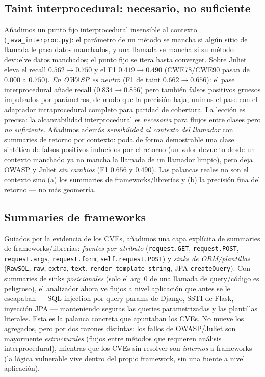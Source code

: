\documentclass[11pt]{article}
\begin{document}
\subsection{Taint interprocedural: necesario, no suficiente}
Añadimos un punto fijo interprocedural insensible al contexto
(\texttt{java\_interproc.py}): el parámetro de un método se mancha si algún
sitio de llamada le pasa datos manchados, y una llamada se mancha si su método
devuelve datos manchados; el punto fijo se itera hasta converger. Sobre Juliet
eleva el recall $0.562\to0.750$ y el F1 $0.419\to0.490$ (CWE78/CWE90 pasan de
$0.000$ a $0.750$). \emph{En OWASP es neutro} (F1 de taint $0.662\to0.656$): el
pase interprocedural añade recall ($0.834\to0.856$) pero también falsos positivos
gruesos impulsados por parámetros, de modo que la precisión baja; unimos el pase
con el adaptador intraprocedural completo para paridad de cobertura. La lección es
precisa: la alcanzabilidad interprocedural es \emph{necesaria} para flujos entre
clases pero \emph{no suficiente}. Añadimos además \emph{sensibilidad al contexto
del llamador} con summaries de retorno por contexto: poda de forma demostrable una
clase sintética de falsos positivos inducidos por el retorno (un valor devuelto
desde un contexto manchado ya no mancha la llamada de un llamador limpio), pero
deja OWASP y Juliet \emph{sin cambios} (F1 $0.656$ y $0.490$). Las palancas reales
no son el contexto sino (a) los summaries de frameworks/librerías y (b) la
precisión fina del retorno --- no más geometría.

\subsection{Summaries de frameworks}
Guiados por la evidencia de los CVEs, añadimos una capa explícita de
summaries de frameworks/librerías: \emph{fuentes por atributo}
(\texttt{request.GET}, \texttt{request.POST}, \texttt{request.args},
\texttt{request.form}, \texttt{self.request.POST}) y \emph{sinks de ORM/plantillas}
(\texttt{RawSQL}, \texttt{raw}, \texttt{extra}, \texttt{text},
\texttt{render\_template\_string}, JPA \texttt{createQuery}). Con summaries de sinks
\emph{posicionales} (solo el arg~0 de una llamada de query/código es peligroso), el
analizador ahora ve flujos a nivel aplicación que antes se le escapaban --- SQL
injection por query-params de Django, SSTI de Flask, inyección JPA --- manteniendo
seguras las queries parametrizadas y las plantillas literales. Esta es la palanca
concreta que apuntaban los CVEs. No mueve los agregados, pero por dos razones
distintas: los fallos de OWASP/Juliet son mayormente \emph{estructurales} (flujos
entre métodos que requieren análisis interprocedural), mientras que los CVEs sin
resolver son \emph{internos} a frameworks (la lógica vulnerable vive dentro del
propio framework, sin una fuente a nivel aplicación).
\end{document}
